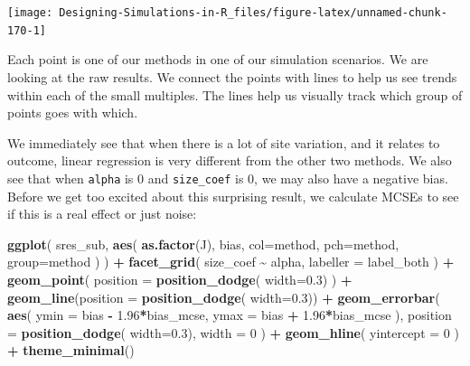 \documentclass[
]{book}
\newenvironment{Shaded}{\begin{snugshade}}{\end{snugshade}}
\newcommand{\AttributeTok}[1]{\textcolor[rgb]{0.13,0.29,0.53}{#1}}
\newcommand{\DecValTok}[1]{\textcolor[rgb]{0.00,0.00,0.81}{#1}}
\newcommand{\FloatTok}[1]{\textcolor[rgb]{0.00,0.00,0.81}{#1}}
\newcommand{\FunctionTok}[1]{\textcolor[rgb]{0.13,0.29,0.53}{\textbf{#1}}}
\newcommand{\NormalTok}[1]{#1}
\newcommand{\SpecialCharTok}[1]{\textcolor[rgb]{0.81,0.36,0.00}{\textbf{#1}}}
\begin{document}
\begin{center}\texttt{[image: Designing-Simulations-in-R\_files/figure-latex/unnamed-chunk-170-1]} \end{center}

Each point is one of our methods in one of our simulation scenarios.
We are looking at the raw results.
We connect the points with lines to help us see trends within each of the small multiples.
The lines help us visually track which group of points goes with which.

We immediately see that when there is a lot of site variation, and it relates to outcome, linear regression is very different from the other two methods.
We also see that when \texttt{alpha} is 0 and \texttt{size\_coef} is 0, we may also have a negative bias.
Before we get too excited about this surprising result, we calculate MCSEs to see if this is a real effect or just noise:

\begin{Shaded}
\begin{Highlighting}[]
\FunctionTok{ggplot}\NormalTok{( sres\_sub, }\FunctionTok{aes}\NormalTok{( }\FunctionTok{as.factor}\NormalTok{(J), bias, }
                       \AttributeTok{col=}\NormalTok{method, }\AttributeTok{pch=}\NormalTok{method, }\AttributeTok{group=}\NormalTok{method ) ) }\SpecialCharTok{+}
  \FunctionTok{facet\_grid}\NormalTok{( size\_coef }\SpecialCharTok{\textasciitilde{}}\NormalTok{ alpha, }\AttributeTok{labeller =}\NormalTok{ label\_both ) }\SpecialCharTok{+}
  \FunctionTok{geom\_point}\NormalTok{( }\AttributeTok{position =} \FunctionTok{position\_dodge}\NormalTok{( }\AttributeTok{width=}\FloatTok{0.3}\NormalTok{) ) }\SpecialCharTok{+}
  \FunctionTok{geom\_line}\NormalTok{(}\AttributeTok{position =} \FunctionTok{position\_dodge}\NormalTok{( }\AttributeTok{width=}\FloatTok{0.3}\NormalTok{)) }\SpecialCharTok{+}
  \FunctionTok{geom\_errorbar}\NormalTok{( }\FunctionTok{aes}\NormalTok{( }\AttributeTok{ymin =}\NormalTok{ bias }\SpecialCharTok{{-}} \FloatTok{1.96}\SpecialCharTok{*}\NormalTok{bias\_mcse,}
                      \AttributeTok{ymax =}\NormalTok{ bias }\SpecialCharTok{+} \FloatTok{1.96}\SpecialCharTok{*}\NormalTok{bias\_mcse ),}
                 \AttributeTok{position =} \FunctionTok{position\_dodge}\NormalTok{( }\AttributeTok{width=}\FloatTok{0.3}\NormalTok{),}
                 \AttributeTok{width =} \DecValTok{0}\NormalTok{ ) }\SpecialCharTok{+}
  \FunctionTok{geom\_hline}\NormalTok{( }\AttributeTok{yintercept =} \DecValTok{0}\NormalTok{ ) }\SpecialCharTok{+}
  \FunctionTok{theme\_minimal}\NormalTok{() }
\end{Highlighting}
\end{Shaded}
\end{document}
